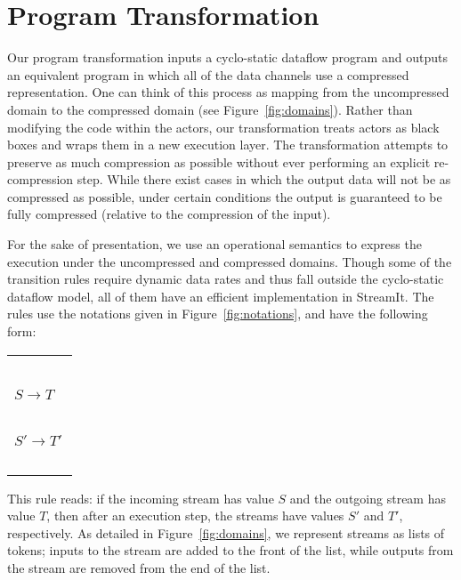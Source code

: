 \section{Program Transformation}
Our program transformation inputs a cyclo-static dataflow program and
outputs an equivalent program in which all of the data channels use a
compressed representation.  One can think of this process as mapping
from the uncompressed domain to the compressed domain (see
Figure~\ref{fig:domains}).  Rather than modifying the code within the
actors, our transformation treats actors as black boxes and wraps them
in a new execution layer.  The transformation attempts to preserve as
much compression as possible without ever performing an explicit
re-compression step.  While there exist cases in which the output data
will not be as compressed as possible, under certain conditions the
output is guaranteed to be fully compressed (relative to the
compression of the input).

For the sake of presentation, we use an operational semantics to
express the execution under the uncompressed and compressed domains.
Though some of the transition rules require dynamic data rates and
thus fall outside the cyclo-static dataflow model, all of them have an
efficient implementation in StreamIt.  The rules use the notations
given in Figure~\ref{fig:notations}, and have the following form:

\hspace{-12pt}\begin{tabular}{l} ~ \vspace{-6pt} \\ 
\hspace{-3pt}$S \rightarrow T$ \hspace{-7pt}~\vspace{0.5pt} \\ \hline ~ \vspace{-7.5pt} \\
\hspace{-3pt}$S' \rightarrow T'$ \hspace{-7pt} \\ ~ \vspace{-6pt} \\
\end{tabular}

This rule reads: if the incoming stream has value $S$ and the outgoing
stream has value $T$, then after an execution step, the streams have
values $S'$ and $T'$, respectively.  As detailed in
Figure~\ref{fig:domains}, we represent streams as lists of tokens;
inputs to the stream are added to the front of the list, while outputs
from the stream are removed from the end of the list.

